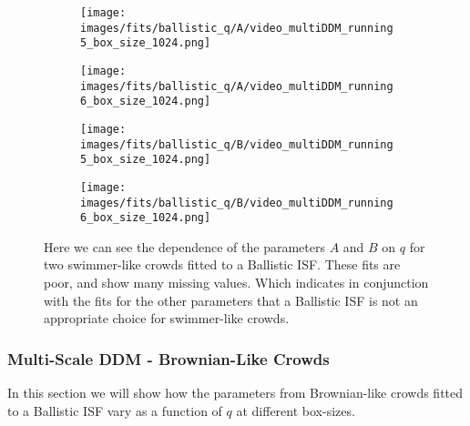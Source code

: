 \documentclass[10pt]{article}
\begin{document}
\begin{figure}[H]
\begin{subfigure}[t]{.5\textwidth}
  \centering
  \texttt{[image: images/fits/ballistic\_q/A/video\_multiDDM\_running5\_box\_size\_1024.png]}
  \caption{}
\end{subfigure}%
\hfill
\begin{subfigure}[t]{.5\textwidth}
  \centering
  \texttt{[image: images/fits/ballistic\_q/A/video\_multiDDM\_running6\_box\_size\_1024.png]}
  \caption{}
\end{subfigure}
\label{fig:running_ballistic_fits_A}
\par\bigskip
\begin{subfigure}[t]{.5\textwidth}
  \centering
  \texttt{[image: images/fits/ballistic\_q/B/video\_multiDDM\_running5\_box\_size\_1024.png]}
  \caption{}
\end{subfigure}%
\hfill
\begin{subfigure}[t]{.5\textwidth}
  \centering
  \texttt{[image: images/fits/ballistic\_q/B/video\_multiDDM\_running6\_box\_size\_1024.png]}
  \caption{}
\end{subfigure}
\caption{Here we can see the dependence of the parameters $A$ and $B$ on $q$ for two swimmer-like crowds fitted to a Ballistic ISF. These fits are poor, and show many missing values. Which indicates in conjunction with the fits for the other parameters that a Ballistic ISF is not an appropriate choice for swimmer-like crowds.}
\label{fig:running_ballistic_fits_B}
\end{figure}

\subsubsection{Multi-Scale DDM - Brownian-Like Crowds}
In this section we will show how the parameters from Brownian-like crowds fitted to a Ballistic ISF vary as a function of $q$ at different box-sizes. 
\end{document}
